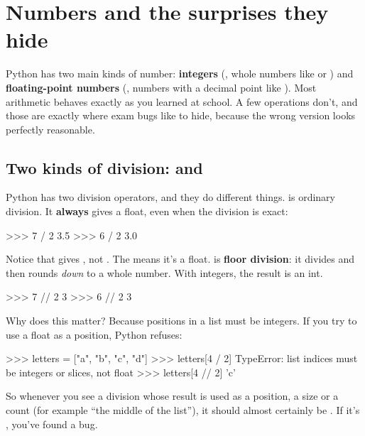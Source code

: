 \documentclass[10pt,a4paper]{article}
\begin{document}
\section{Numbers and the surprises they hide}
Python has two main kinds of number: \textbf{integers} (, whole numbers like  or ) and \textbf{floating-point numbers} (, numbers with a decimal point like ). Most arithmetic behaves exactly as you learned at school. A few operations don’t, and those are exactly where exam bugs like to hide, because the wrong version looks perfectly reasonable.
\subsection{Two kinds of division: \code{/\allowbreak{}} and \code{/\allowbreak{}/\allowbreak{}}}
Python has two division operators, and they do different things.
\code{/\allowbreak{}} is ordinary division. It \textbf{always} gives a float, even when the division is exact:
\begin{txtcode}
>>> 7 / 2
3.5
>>> 6 / 2
3.0
\end{txtcode}
Notice that  gives , not . The  means it’s a float.
\code{/\allowbreak{}/\allowbreak{}} is \textbf{floor division}: it divides and then rounds \emph{down} to a whole number. With integers, the result is an int.
\begin{txtcode}
>>> 7 // 2
3
>>> 6 // 2
3
\end{txtcode}
Why does this matter? Because positions in a list must be integers. If you try to use a float as a position, Python refuses:
\begin{txtcode}
>>> letters = ["a", "b", "c", "d"]
>>> letters[4 / 2]
TypeError: list indices must be integers or slices, not float
>>> letters[4 // 2]
'c'
\end{txtcode}
So whenever you see a division whose result is used as a position, a size or a count (for example “the middle of the list”), it should almost certainly be \code{/\allowbreak{}/\allowbreak{}}. If it’s \code{/\allowbreak{}}, you’ve found a bug.
\end{document}
